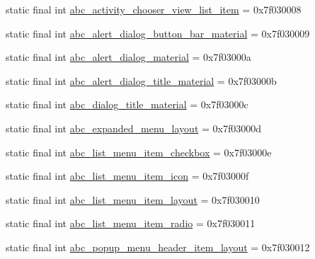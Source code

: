 \begin{CompactItemize}
\item 
static final int \hyperlink{classandroid_1_1support_1_1graphics_1_1drawable_1_1animated_1_1_r_1_1layout_adcd6ff4a568c280fac9623a2d904ef1}{abc\_\-activity\_\-chooser\_\-view\_\-list\_\-item} = 0x7f030008
\item 
static final int \hyperlink{classandroid_1_1support_1_1graphics_1_1drawable_1_1animated_1_1_r_1_1layout_376002fff57ccf6735c27cd6188ae5e6}{abc\_\-alert\_\-dialog\_\-button\_\-bar\_\-material} = 0x7f030009
\item 
static final int \hyperlink{classandroid_1_1support_1_1graphics_1_1drawable_1_1animated_1_1_r_1_1layout_a9250edb89f91c47d60012443228be42}{abc\_\-alert\_\-dialog\_\-material} = 0x7f03000a
\item 
static final int \hyperlink{classandroid_1_1support_1_1graphics_1_1drawable_1_1animated_1_1_r_1_1layout_d9151c1a2f2120ae79a74a31d47d2d93}{abc\_\-alert\_\-dialog\_\-title\_\-material} = 0x7f03000b
\item 
static final int \hyperlink{classandroid_1_1support_1_1graphics_1_1drawable_1_1animated_1_1_r_1_1layout_5dbb81ab1a791c5a7cddb784b937ccfb}{abc\_\-dialog\_\-title\_\-material} = 0x7f03000c
\item 
static final int \hyperlink{classandroid_1_1support_1_1graphics_1_1drawable_1_1animated_1_1_r_1_1layout_fed4f0592263851e180788f4c8375e4a}{abc\_\-expanded\_\-menu\_\-layout} = 0x7f03000d
\item 
static final int \hyperlink{classandroid_1_1support_1_1graphics_1_1drawable_1_1animated_1_1_r_1_1layout_cc99232207a47722ac9dd9607c033348}{abc\_\-list\_\-menu\_\-item\_\-checkbox} = 0x7f03000e
\item 
static final int \hyperlink{classandroid_1_1support_1_1graphics_1_1drawable_1_1animated_1_1_r_1_1layout_1e9eaa8f6e47f3b8977aa58396413586}{abc\_\-list\_\-menu\_\-item\_\-icon} = 0x7f03000f
\item 
static final int \hyperlink{classandroid_1_1support_1_1graphics_1_1drawable_1_1animated_1_1_r_1_1layout_a05f573af6b817decf5f3652ae2dc673}{abc\_\-list\_\-menu\_\-item\_\-layout} = 0x7f030010
\item 
static final int \hyperlink{classandroid_1_1support_1_1graphics_1_1drawable_1_1animated_1_1_r_1_1layout_1e33c79225cf940e8597d2d922435bc0}{abc\_\-list\_\-menu\_\-item\_\-radio} = 0x7f030011
\item 
static final int \hyperlink{classandroid_1_1support_1_1graphics_1_1drawable_1_1animated_1_1_r_1_1layout_63d4c9337a1944acedca5560580af6bd}{abc\_\-popup\_\-menu\_\-header\_\-item\_\-layout} = 0x7f030012

\end{CompactItemize}
